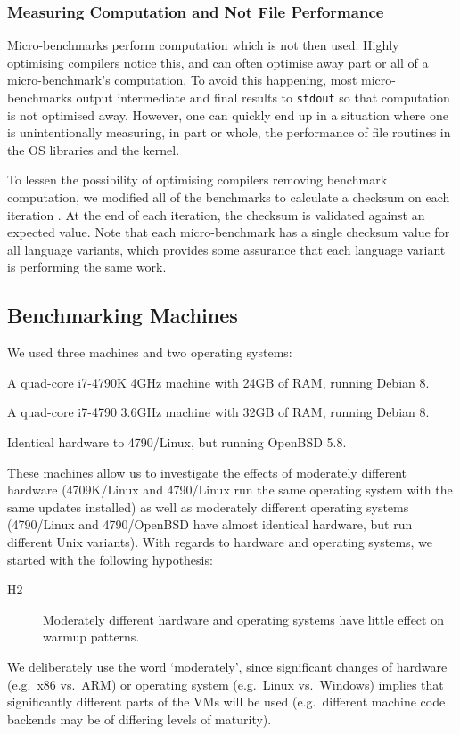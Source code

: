 \documentclass[10pt,preprint]{sigplanconf}
\newcommand{\hyptwo}{H2\xspace}
\newcommand{\bencherthree}{4709K/Linux\xspace}
\newcommand{\bencherfive}{4790/Linux\xspace}
\newcommand{\benchersix}{4790/OpenBSD\xspace}
\begin{document}
\subsubsection{Measuring Computation and Not File Performance}

Micro-benchmarks perform computation which is not then used. Highly optimising
compilers notice this, and can often optimise away part or all of a
micro-benchmark's computation. To avoid this happening, most micro-benchmarks
output intermediate and final results to \texttt{stdout} so that computation is
not optimised away. However, one can quickly end up in a situation where one is
unintentionally measuring, in part or whole, the performance of file routines in
the OS libraries and the kernel.

To lessen the possibility of optimising compilers removing benchmark computation,
we modified all of the benchmarks to calculate a checksum on each iteration
.
At the end of each iteration, the checksum is validated against an expected
value. Note that each micro-benchmark has a single checksum value for all
language variants, which provides some assurance that each language variant is
performing the same work.


\subsection{Benchmarking Machines}

We used three machines and two operating systems:
\begin{description*}
  \item[\bencherthree] A quad-core i7-4790K 4GHz machine with 24GB of RAM, running Debian 8.
  \item[\bencherfive] A quad-core i7-4790 3.6GHz machine with 32GB of RAM, running Debian 8.
  \item[\benchersix] Identical hardware to \bencherfive, but running OpenBSD 5.8.
\end{description*}
These machines allow us to investigate the effects of moderately different
hardware (\bencherthree and \bencherfive run the same operating system with the
same updates installed) as well as moderately different operating systems
(\bencherfive and \benchersix have almost identical hardware, but run different
Unix
variants). With regards to hardware and operating systems, we started with the
following hypothesis:
\begin{description}
  \item[\hyptwo] Moderately different hardware and operating systems have little effect on warmup patterns.
\end{description}
We deliberately use the word `moderately', since significant changes of hardware
(e.g.~x86 vs.~ARM) or operating system (e.g.~Linux vs.~Windows) implies that
significantly different parts of the VMs will be used (e.g.~different machine
code backends may be of differing levels of maturity).
\end{document}
